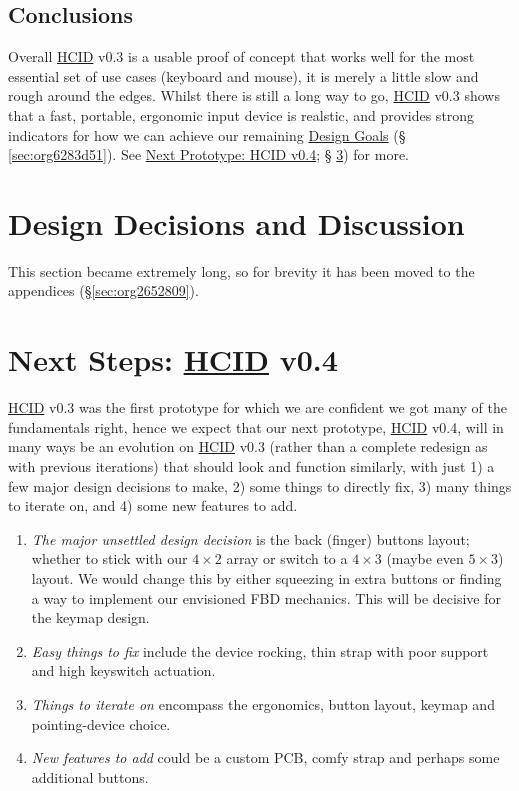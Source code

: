 \documentclass[logo,bsc,singlespacing,parskip]{infthesis}
\begin{document}
\section{Conclusions}
\label{sec:org7635445}
Overall \hyperref[orgf95a76e]{HCID} v0.3 is a usable proof of concept that works well for the most essential set of use cases (keyboard and mouse), it is merely a little slow and rough around the edges.
Whilst there is still a long way to go, \hyperref[orgf95a76e]{HCID} v0.3 shows that a fast, portable, ergonomic input device is realstic, and provides strong indicators for how we can achieve our remaining \hyperref[sec:org6283d51]{Design Goals} (§ \ref{sec:org6283d51}). See \hyperref[sec:org186ba86]{Next Prototype: HCID v0.4}; § \ref{sec:org186ba86}) for more.
\chapter{Design Decisions and Discussion}
\label{sec:org385b3cd}
This section became extremely long, so for brevity it has been moved to the appendices (\S \ref{sec:org2652809}).

\chapter{Next Steps: \hyperref[orgf95a76e]{HCID} v0.4}
\label{sec:org186ba86}
\hyperref[orgf95a76e]{HCID} v0.3 was the first prototype for which we are confident we got  many of the fundamentals right, hence we expect that our next prototype,  \hyperref[orgf95a76e]{HCID} v0.4, will in many ways be an evolution on \hyperref[orgf95a76e]{HCID} v0.3 (rather than a complete redesign as with previous iterations) that should look and function similarly, with just 1) a few major design decisions to make, 2) some things to directly fix, 3) many things to iterate on, and  4) some new features to add.

\begin{enumerate}
\item \emph{The major unsettled design decision} is the back (finger) buttons layout; whether to stick with our \(4\times2\) array or switch to a \(4\times3\) (maybe even \(5\times3\)) layout.
We would change this by either squeezing in extra buttons or finding a way to implement our envisioned FBD mechanics. This will be decisive for the keymap design.

\item \emph{Easy things to fix} include the device rocking, thin strap with poor support and high keyswitch actuation.

\item \emph{Things to iterate on} encompass the ergonomics, button layout, keymap and pointing-device choice.

\item \emph{New features to add} could be a custom PCB, comfy strap and perhaps some additional buttons.
\end{enumerate}
\iffalse
\end{document}
